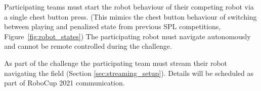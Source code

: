 Participating teams must start the robot behaviour of their competing robot via a single chest button press. (This mimics the chest button behaviour of switching between playing and penalized state from previous SPL competitions, \cf Figure~\ref{fig:robot_states}) The participating robot must navigate autonomously and cannot be remote controlled during the challenge.

As part of the challenge the participating team must stream their robot navigating the field (\cf Section \ref{sec:streaming_setup}). Details will be scheduled as part of RoboCup 2021 communication.

